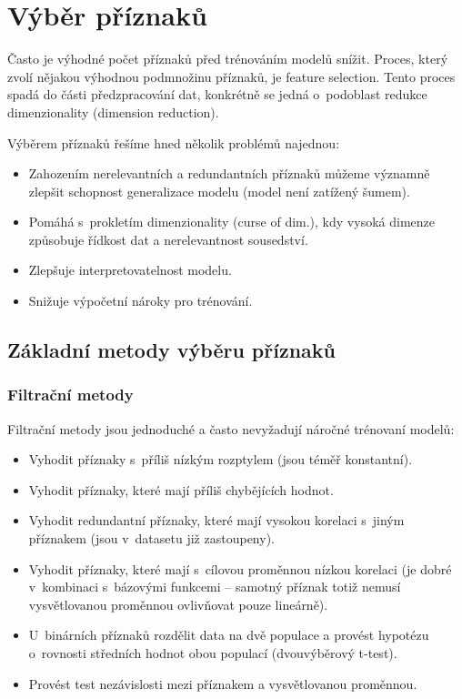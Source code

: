 \section{Výběr příznaků}

Často je výhodné počet příznaků před trénováním modelů snížit. Proces, který zvolí nějakou výhodnou podmnožinu příznaků, je feature selection. Tento proces spadá do části předzpracování dat, konkrétně se jedná o~podoblast redukce dimenzionality (dimension reduction).

Výběrem příznaků řešíme hned několik problémů najednou:
\begin{itemize}
    \item Zahozením nerelevantních a redundantních příznaků můžeme významně zlepšit schopnost generalizace modelu (model není zatížený šumem).
    \item Pomáhá s~prokletím dimenzionality (curse of dim.), kdy vysoká dimenze způsobuje řídkost dat a nerelevantnost sousedství.
    \item Zlepšuje interpretovatelnost modelu.
    \item Snižuje výpočetní nároky pro trénování.
\end{itemize}

\subsection{Základní metody výběru příznaků}

\subsubsection{Filtrační metody}

Filtrační metody jsou jednoduché a často nevyžadují náročné trénovaní modelů:
\begin{itemize}

    \item Vyhodit příznaky s~příliš nízkým rozptylem (jsou téměř konstantní).

    \item Vyhodit příznaky, které mají příliš chybějících hodnot.

    \item Vyhodit redundantní příznaky, které mají vysokou korelaci s~jiným příznakem (jsou v~datasetu již zastoupeny).

    \item Vyhodit příznaky, které mají s~cílovou proměnnou nízkou korelaci (je dobré v~kombinaci s~bázovými funkcemi -- samotný příznak totiž nemusí vysvětlovanou proměnnou ovlivňovat pouze lineárně).

    \item U~binárních příznaků rozdělit data na dvě populace a provést hypotézu o~rovnosti středních hodnot obou populací (dvouvýběrový t-test).

    \item Provést test nezávislosti mezi příznakem a vysvětlovanou proměnnou.

\end{itemize}


